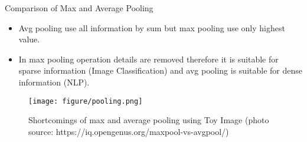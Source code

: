 \begin{vbframe}{Comparison of Max and Average Pooling}
\begin{itemize}
\item Avg pooling use all information by sum but max pooling use only highest value.
\item In max pooling operation details are removed therefore it is suitable for sparse information (Image Classification) and avg pooling is suitable for dense information (NLP). 
\end{itemize}
\begin{figure}
\centering
\texttt{[image: figure/pooling.png]}
\caption{Shortcomings of max and average pooling using Toy Image (photo source: https://iq.opengenus.org/maxpool-vs-avgpool/)}
\end{figure}
\end{vbframe}



\endlecture
